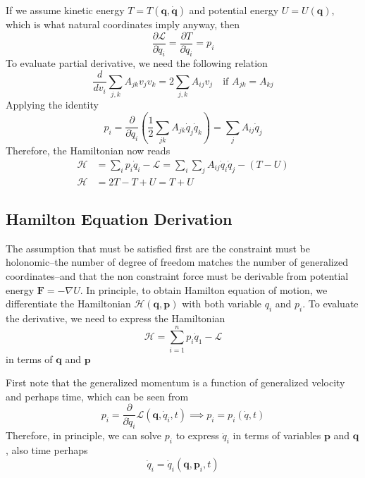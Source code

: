 \documentclass[../../../main.tex]{subfiles}
\begin{document}
If we assume kinetic energy $T=T(\mathbf{q},\dot{\mathbf{q}})$ and potential energy $U=U(\mathbf{q})$, which is what natural coordinates imply anyway, then
\begin{equation*}
	\frac{\partial \mathcal{L}}{\partial \dot{q}_i}=\frac{\partial T}{\partial \dot{q}_i}=p_i
\end{equation*}
To evaluate partial derivative, we need the following relation
\begin{equation*}
	\frac{d}{dv_i}\sum_{j,k}A_{jk}v_jv_k=2\sum_{j,k}A_{ij}v_j\quad\text{if }A_{jk}=A_{kj}
\end{equation*}
Applying the identity
\begin{equation*}
	p_i=\frac{\partial}{\partial \dot{q}_i}\left(\frac{1}{2}\sum_{jk}A_{jk}\dot{q}_j\dot{q}_k\right)=\sum_jA_{ij}\dot{q}_j\end{equation*}
Therefore, the Hamiltonian now reads
\begin{align*}
	\mathcal{H} & =\sum_ip_i\dot{q}_i-\mathcal{L}=\sum_i\sum_jA_{ij}\dot{q}_i\dot{q}_j-(T-U) \\
	\mathcal{H} & =2T-T+U=T+U
\end{align*}

\subsection{Hamilton Equation Derivation}
The assumption that must be satisfied first are the constraint must be holonomic--the number of degree of freedom matches the number of generalized coordinates--and that the non constraint force must be derivable from potential energy $\mathbf{F}=-\nabla U$.
In principle, to obtain Hamilton equation of motion, we differentiate the Hamiltonian $\mathcal{H}(\mathbf{q},\mathbf{p})$ with both variable $q_i$ and $p_i$.
To evaluate the derivative, we need to express the Hamiltonian
\begin{equation*}
	\mathcal{H}=\sum_{i=1}^{n}p_i\dot{q}_1-\mathcal{L}
\end{equation*}
in terms of $\mathbf{q}$ and $\mathbf{p}$

First note that the generalized momentum is a function of generalized velocity and perhaps time, which can be seen from
\begin{equation*}
	p_i=\frac{\partial}{\partial \dot{q}_i}\mathcal{L}(\mathbf{q},\dot{q}_i,t)\implies p_i=p_i\left(\dot{q},t\right)
\end{equation*}
Therefore, in principle, we can solve $p_i$ to express $\dot{q}_i$ in terms of variables $\mathbf{p}$ and $\mathbf{q}$, also time perhaps
\begin{equation*}
	\dot{q}_i=\dot{q}_i(\mathbf{q},\mathbf{p}_i,t)
\end{equation*}
\end{document}
